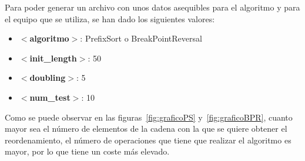 \documentclass[11pt,letterpaper]{article}
\begin{document}
Para poder generar un archivo con unos datos asequibles para el algoritmo y para el equipo que se utiliza, se han dado los siguientes valores: 

\begin{multicols}{2}
	\begin{itemize}
		\item \textbf{$<$algoritmo$>$}: PrefixSort o BreakPointReversal
		\item \textbf{$<$init\_length$>$}: 50
		\item \textbf{$<$doubling$>$}: 5
		\item \textbf{$<$num\_test$>$}: 10
	\end{itemize}
\end{multicols}

Como se puede observar en las figuras~\ref{fig:graficoPS} y~\ref{fig:graficoBPR}, cuanto mayor sea el número de elementos de la cadena con la que se quiere obtener el reordenamiento, el número de operaciones que tiene que realizar el algoritmo es mayor, por lo que tiene un coste más elevado. 
\end{document}
